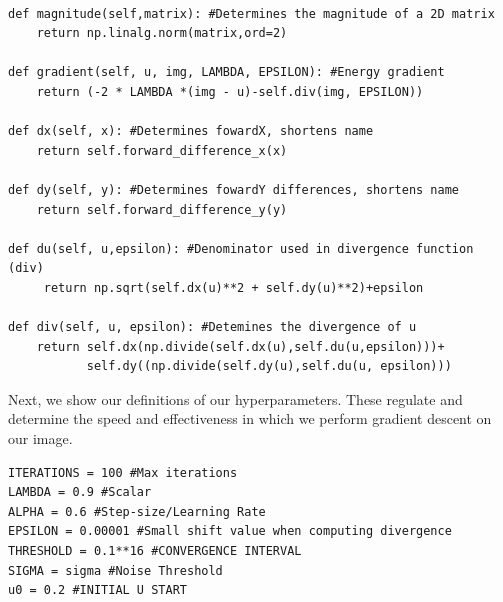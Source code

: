 \documentclass[12pt]{article}
\begin{document}
\pagebreak\\
\begin{mdframed}[backgroundcolor=bg]
\begin{verbatim}
def magnitude(self,matrix): #Determines the magnitude of a 2D matrix
    return np.linalg.norm(matrix,ord=2)

def gradient(self, u, img, LAMBDA, EPSILON): #Energy gradient 
    return (-2 * LAMBDA *(img - u)-self.div(img, EPSILON))

def dx(self, x): #Determines fowardX, shortens name
    return self.forward_difference_x(x) 

def dy(self, y): #Determines fowardY differences, shortens name
    return self.forward_difference_y(y)

def du(self, u,epsilon): #Denominator used in divergence function (div)
     return np.sqrt(self.dx(u)**2 + self.dy(u)**2)+epsilon 

def div(self, u, epsilon): #Detemines the divergence of u 
    return self.dx(np.divide(self.dx(u),self.du(u,epsilon)))+
           self.dy((np.divide(self.dy(u),self.du(u, epsilon)))
\end{verbatim}
\end{mdframed}
\;
\;

\noindent Next, we show our definitions of our hyperparameters. These regulate and determine the speed and effectiveness in which we perform gradient descent on our image.\\

\begin{mdframed}[backgroundcolor=bg]
\begin{verbatim}
ITERATIONS = 100 #Max iterations
LAMBDA = 0.9 #Scalar
ALPHA = 0.6 #Step-size/Learning Rate
EPSILON = 0.00001 #Small shift value when computing divergence
THRESHOLD = 0.1**16 #CONVERGENCE INTERVAL 
SIGMA = sigma #Noise Threshold
u0 = 0.2 #INITIAL U START
\end{verbatim}
\end{mdframed}
\;
\;
\end{document}

